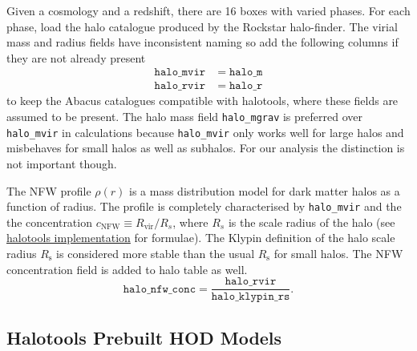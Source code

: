 \documentclass[fleqn,usenatbib]{mnras}
\begin{document}
		Given a cosmology and a redshift, there are 16 boxes with varied phases. For each phase, load the halo catalogue produced by the Rockstar halo-finder. The virial mass and radius fields have inconsistent naming so add the following columns if they are not already present
		\begin{align}
			\mathtt{halo\_mvir} & = \mathtt{halo\_m} \\
			\mathtt{halo\_rvir} & = \mathtt{halo\_r}
		\end{align}
		to keep the Abacus catalogues compatible with halotools, where these fields are assumed to be present. The halo mass field \texttt{halo\_mgrav} is preferred over \texttt{halo\_mvir} in calculations because \texttt{halo\_mvir} only works well for large halos and misbehaves for small halos as well as subhalos. For our analysis the distinction is not important though. 
		
		The NFW profile $\rho(r)$ is a mass distribution model for dark matter halos as a function of radius. The profile is completely characterised by \texttt{halo\_mvir} and the the concentration $c_\text{NFW} \equiv R_\text{vir}/{R_s}$, where $R_s$ is the scale radius of the halo (see \href{http://halotools.readthedocs.io/en/latest/source_notes/empirical_models/phase_space_models/nfw_profile_source_notes.html#nfw-profile-tutorial}{halotools implementation} for formulae). The Klypin definition of the halo scale radius $R_\text{s}$ is considered more stable than the usual $R_\text{s}$ for small halos. The NFW concentration field is added to halo table as well.
		\begin{equation}
			\mathtt{halo\_nfw\_conc} = \frac{\mathtt{halo\_rvir}}{\mathtt{halo\_klypin\_rs}}.
		\end{equation}
		
	\subsection{Halotools Prebuilt HOD Models}
		
\end{document}
